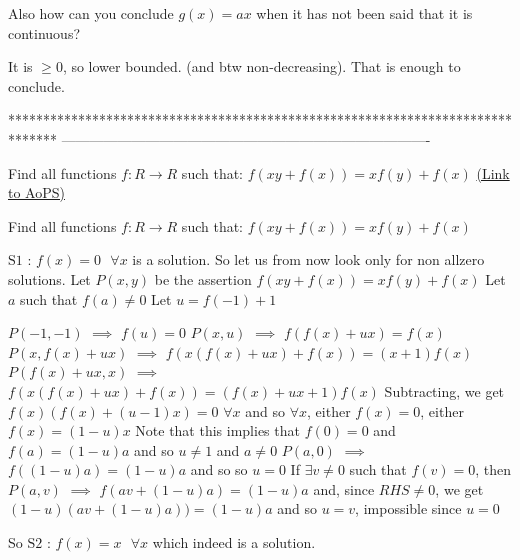 \begin{solution}
	\begin{tcolorbox}Also how can you conclude $g(x)=ax$ when it has not been said that it is continuous?\end{tcolorbox}
It is $\ge 0$, so lower bounded. (and btw non-decreasing). That is enough to conclude.
\end{solution}
*******************************************************************************
-------------------------------------------------------------------------------

\begin{problem}
	Find all functions $f:R\to R$ such that:
 $f(xy+f(x))=xf(y)+f(x)$
	\flushright \href{https://artofproblemsolving.com/community/c6h619265}{(Link to AoPS)}
\end{problem}



\begin{solution}
	\begin{tcolorbox}Find all functions $f:R\to R$ such that:
 $f(xy+f(x))=xf(y)+f(x)$\end{tcolorbox}
$\boxed{\text{S1 : }f(x)=0\text{  }\forall x}$ is a solution. So let us from now look only for non allzero solutions.
Let $P(x,y)$ be the assertion $f(xy+f(x))=xf(y)+f(x)$
Let $a$ such that $f(a)\ne 0$
Let $u=f(-1)+1$

$P(-1,-1)$ $\implies$ $f(u)=0$
$P(x,u)$ $\implies$ $f(f(x)+ux)=f(x)$
$P(x,f(x)+ux)$ $\implies$ $f(x(f(x)+ux)+f(x))=(x+1)f(x)$
$P(f(x)+ux,x)$ $\implies$ $f(x(f(x)+ux)+f(x))=(f(x)+ux+1)f(x)$
Subtracting, we get $f(x)(f(x)+(u-1)x)=0$ $\forall x$ and so $\forall x$, either $f(x)=0$, either $f(x)=(1-u)x$
Note that this implies that $f(0)=0$ and $f(a)=(1-u)a$ and so $u\ne 1$ and $a\ne 0$
$P(a,0)$ $\implies$ $f((1-u)a)=(1-u)a$ and so so $u=0$
If $\exists v\ne 0$ such that $f(v)=0$, then $P(a,v)$ $\implies$ $f(av+(1-u)a)=(1-u)a$ and, since $RHS\ne 0$, we get $(1-u)(av+(1-u)a))=(1-u)a$ and so $u=v$, impossible since $u=0$

So $\boxed{\text{S2 : }f(x)=x\text{  }\forall x}$ which indeed is a solution.
\end{solution}



